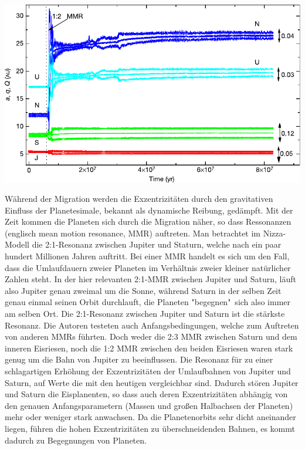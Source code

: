 \documentclass[10pt,a4paper,twoside]{article}
\renewenvironment{figure}{}{}
\begin{document}
\begin{figure}[tbn]
\includegraphics[scale=1]{img/Tsiganis2005-1.pdf}
\caption{•}
\end{figure}
Während der Migration werden die Exzentrizitäten durch den gravitativen Einfluss der Planetesimale, bekannt als dynamische Reibung, gedämpft.\cite{Tsiganis2005}
Mit der Zeit kommen die Planeten sich durch die Migration näher, so dass Ressonanzen (englisch mean motion resonance, MMR) auftreten.
Man betrachtet im Nizza-Modell die 2:1-Resonanz zwischen Jupiter und Staturn, welche nach ein paar hundert Millionen Jahren auftritt.
Bei einer MMR handelt es sich um den Fall, dass die Umlaufdauern zweier Planeten im Verhältnis zweier kleiner natürlicher Zahlen steht. In der hier relevanten 2:1-MMR zwischen Jupiter und Saturn, läuft also Jupiter genau zweimal um die Sonne, während Saturn in der selben Zeit genau einmal seinen Orbit durchlauft, die Planeten "begegnen"\ sich also immer am selben Ort. %
Die 2:1-Resonanz zwischen Jupiter und Saturn ist die stärkste Resonanz. %
Die Autoren testeten auch Anfangsbedingungen, welche zum Auftreten von anderen MMRs führten. Doch weder die 2:3 MMR zwischen Saturn und dem inneren Eisriesen, noch die 1:2 MMR zwischen den beiden Eisriesen waren stark genug um die Bahn von Jupiter zu beeinflussen\cite{Tsiganis2005}. %
Die Resonanz für zu einer schlagartigen Erhöhung der Exzentrizitäten der Umlaufbahnen von Jupiter und Saturn, auf Werte die mit den heutigen vergleichbar sind. %
Dadurch stören Jupiter und Saturn die Eisplanenten, so dass auch deren Exzentrizitäten abhängig von den genauen Anfangsparametern (Massen und großen Halbachsen der Planeten) mehr oder weniger stark anwachsen\cite{Tsiganis2005}.
Da die Planetenorbits sehr dicht aneinander liegen, führen die hohen Exzentrizitäten zu überschneidenden Bahnen\cite{Tsiganis2005}, es kommt dadurch zu Begegnungen von Planeten. %
\end{document}
